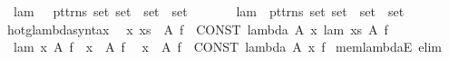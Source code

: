 \begin{isabellebody}
\isamarkupfalse%
\isanewline
\ \ {\isachardoublequoteopen}{\isacharunderscore}{\kern0pt}lam{\isachardoublequoteclose}\ \ {\isacharcolon}{\kern0pt}{\isacharcolon}{\kern0pt}\ {\isachardoublequoteopen}{\isacharbrackleft}{\kern0pt}pttrns{\isacharcomma}{\kern0pt}\ set{\isacharcomma}{\kern0pt}\ set\ {\isasymRightarrow}\ set{\isacharbrackright}{\kern0pt}\ {\isasymRightarrow}\ set{\isachardoublequoteclose}\ {\isacharparenleft}{\kern0pt}{\isachardoublequoteopen}{\isacharparenleft}{\kern0pt}{}{\isasymlambda}{\isacharunderscore}{\kern0pt}\ {\isasymin}\ {\isacharunderscore}{\kern0pt}{\isachardot}{\kern0pt}{\isacharslash}{\kern0pt}\ {\isacharunderscore}{\kern0pt}{\isacharparenright}{\kern0pt}{\isachardoublequoteclose}\ {}{}{\isacharparenright}{\kern0pt}\isanewline
\ \ {\isachardoublequoteopen}{\isacharunderscore}{\kern0pt}lam{}{\isachardoublequoteclose}\ {\isacharcolon}{\kern0pt}{\isacharcolon}{\kern0pt}\ {\isachardoublequoteopen}{\isacharbrackleft}{\kern0pt}pttrns{\isacharcomma}{\kern0pt}\ set{\isacharcomma}{\kern0pt}\ set\ {\isasymRightarrow}\ set{\isacharbrackright}{\kern0pt}\ {\isasymRightarrow}\ set{\isachardoublequoteclose}\isanewline
{}\isamarkupfalse%
\isanewline
{}\isamarkupfalse%
\ hotg{\isacharunderscore}{\kern0pt}lambda{\isacharunderscore}{\kern0pt}syntax\isanewline
\isanewline
{}\isamarkupfalse%
\isanewline
\ \ {\isachardoublequoteopen}{\isasymlambda}x\ xs\ {\isasymin}\ A{\isachardot}{\kern0pt}\ f{\isachardoublequoteclose}\ {\isasymrightharpoonup}\ {\isachardoublequoteopen}CONST\ lambda\ A\ {\isacharparenleft}{\kern0pt}{\isasymlambda}x{\isachardot}{\kern0pt}\ {\isacharunderscore}{\kern0pt}lam{}\ xs\ A\ f{\isacharparenright}{\kern0pt}{\isachardoublequoteclose}\isanewline
\ \ {\isachardoublequoteopen}{\isacharunderscore}{\kern0pt}lam{}\ x\ A\ f{\isachardoublequoteclose}\ {\isasymrightharpoonup}\ {\isachardoublequoteopen}{\isasymlambda}x\ {\isasymin}\ A{\isachardot}{\kern0pt}\ f{\isachardoublequoteclose}\isanewline
\ \ {\isachardoublequoteopen}{\isasymlambda}x\ {\isasymin}\ A{\isachardot}{\kern0pt}\ f{\isachardoublequoteclose}\ {\isasymrightleftharpoons}\ {\isachardoublequoteopen}CONST\ lambda\ A\ {\isacharparenleft}{\kern0pt}{\isasymlambda}x{\isachardot}{\kern0pt}\ f{\isacharparenright}{\kern0pt}{\isachardoublequoteclose}\isanewline
\isanewline
{}\isamarkupfalse%
\ mem{\isacharunderscore}{\kern0pt}lambdaE\ {\isacharbrackleft}{\kern0pt}elim{\isacharbang}{\kern0pt}{\isacharbrackright}{\kern0pt}{\isacharcolon}{\kern0pt}\isanewline

\end{isabellebody}
